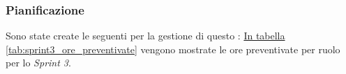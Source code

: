 \subsubsection{Pianificazione}
Sono state create le seguenti  per la gestione di questo : 
\hyperref[tab:sprint3_ore_preventivate]{In tabella \ref{tab:sprint3_ore_preventivate}} vengono mostrate le ore preventivate per ruolo per lo \textit{Sprint 3}.

\begin{table}[H]
    \centering
    \caption{Ore preventivate per ruolo Sprint 3}
    \label{tab:sprint3_ore_preventivate}
\end{table}